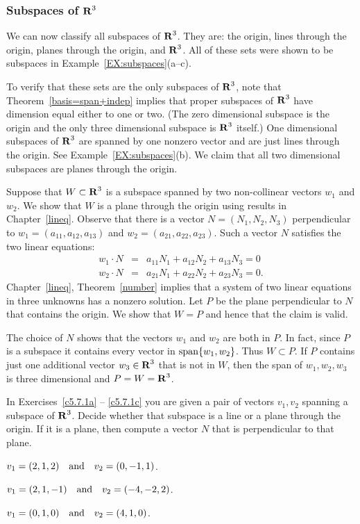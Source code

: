 \subsubsection*{Subspaces of $\mbox{$\bf{R}$}^3$}

We can now classify all subspaces of $\mbox{$\bf{R}$}^3$.  They are:  the origin, lines
through the origin, planes through the origin, and $\mbox{$\bf{R}$}^3$.  All of these
sets were shown to be subspaces in Example~\ref{EX:subspaces}(a--c).

To verify that these sets are the only subspaces of $\mbox{$\bf{R}$}^3$, note that
Theorem~\ref{basis=span+indep} implies that proper subspaces of $\mbox{$\bf{R}$}^3$ have
dimension equal either to one or two. (The zero dimensional subspace is the
origin and the only three dimensional subspace is $\mbox{$\bf{R}$}^3$ itself.)  One
dimensional subspaces of $\mbox{$\bf{R}$}^3$ are spanned by one nonzero vector and are just
lines through the origin.  See Example~\ref{EX:subspaces}(b).  We claim that
all two dimensional subspaces are planes through the origin.

Suppose that $W\subset\mbox{$\bf{R}$}^3$ is a subspace spanned by two non-collinear vectors
$w_1$ and $w_2$.  We show that $W$ is a plane 
through the origin using results in Chapter~\ref{lineq}.  Observe that there
is a vector $N=(N_1,N_2,N_3)$ perpendicular to $w_1=(a_{11},a_{12},a_{13})$
and $w_2=(a_{21},a_{22},a_{23})$.  Such a vector $N$ satisfies the two linear
equations:
\begin{eqnarray*}
w_1\cdot N & = & a_{11}N_1 + a_{12}N_2 + a_{13}N_3 = 0 \\
w_2\cdot N & = & a_{21}N_1 + a_{22}N_2 + a_{23}N_3 = 0.
\end{eqnarray*}
Chapter~\ref{lineq}, Theorem~\ref{number} implies that a system of two linear
equations in three unknowns has a nonzero solution.  Let $P$ be the plane
perpendicular  to $N$ that contains the origin.  We show
that $W=P$ and hence that the claim is valid.

The choice of $N$ shows that the vectors $w_1$ and $w_2$ are both in $P$. In
fact, since $P$ is a subspace it contains every vector in ${\rm span}\{w_1,w_2\}$.
Thus $W\subset P$.  If $P$ contains just one additional vector $w_3\in\mbox{$\bf{R}$}^3$
that is not in $W$, then the span of $w_1,w_2,w_3$ is three dimensional and
$P=W=\mbox{$\bf{R}$}^3$.



\EXER

\TEXER



\noindent In Exercises~\ref{c5.7.1a} -- \ref{c5.7.1c} you are
given a pair of vectors $v_1,v_2$ spanning a subspace of $\mbox{$\bf{R}$}^3$.
Decide whether that subspace is a line or a plane through the
origin.  If it is a plane, then compute a vector $N$ that is
perpendicular to that plane.
\begin{exercise} \label{c5.7.1a}
$v_1=(2,1,2) \quad\mbox{and}\quad v_2=(0,-1,1)$.
\end{exercise}
\begin{exercise} \label{c5.7.1b}
$v_1=(2,1,-1) \quad\mbox{and}\quad v_2=(-4,-2,2)$.
\end{exercise}
\begin{exercise} \label{c5.7.1c}
$v_1=(0,1,0) \quad\mbox{and}\quad v_2=(4,1,0)$.
\end{exercise}

